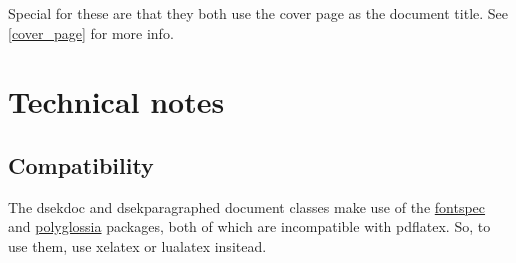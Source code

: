 \documentclass[a4paper, oneside]{ltxdoc}
\begin{document}
Special for these are that they both use the cover page as the document title.
See \ref{cover_page} for more info.

\section{Technical notes}

\subsection{Compatibility}

The \textsf{dsekdoc} and \textsf{dsekparagraphed} document classes make use of
the \href{https://ctan.org/pkg/fontspec}{\textsf{fontspec}} and
\href{https://ctan.org/pkg/polyglossia}{\textsf{polyglossia}} packages, both of
which are incompatible with \textsf{pdflatex}.  So, to use them, use
\textsf{xelatex} or \textsf{lualatex} insitead.
\end{document}
